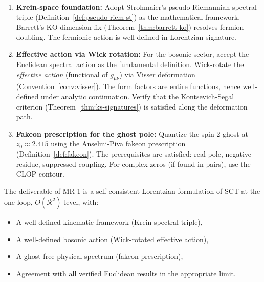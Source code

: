 \documentclass[12pt,a4paper]{article}
\theoremstyle{definition}
\theoremstyle{remark}
\begin{document}
\begin{enumerate}[label=\textbf{(\Alph*)}]

\item \textbf{Krein-space foundation:}
  Adopt Strohmaier's pseudo-Riemannian spectral triple
  (Definition~\ref{def:pseudo-riem-st}) as the mathematical framework.
  Barrett's KO-dimension fix (Theorem~\ref{thm:barrett-ko}) resolves
  fermion doubling.  The fermionic action is well-defined in Lorentzian
  signature.

\item \textbf{Effective action via Wick rotation:}
  For the bosonic sector, accept the Euclidean spectral action as the
  fundamental definition.  Wick-rotate the \emph{effective action}
  (functional of $g_{\mu\nu}$) via Visser deformation
  (Convention~\ref{conv:visser}).  The form factors are entire functions,
  hence well-defined under analytic continuation.  Verify that the
  Kontsevich-Segal criterion (Theorem~\ref{thm:ks-signatures}) is
  satisfied along the deformation path.

\item \textbf{Fakeon prescription for the ghost pole:}
  Quantize the spin-2 ghost at $z_0 \approx 2.415$ using the
  Anselmi-Piva fakeon prescription
  (Definition~\ref{def:fakeon}).  The prerequisites are satisfied:
  real pole, negative residue, suppressed coupling.  For complex zeros
  (if found in pairs), use the CLOP contour.
\end{enumerate}

The deliverable of MR-1 is a self-consistent Lorentzian formulation of
SCT at the one-loop, $O(\mathcal{R}^2)$ level, with:
\begin{itemize}[nosep]
  \item A well-defined kinematic framework (Krein spectral triple),
  \item A well-defined bosonic action (Wick-rotated effective action),
  \item A ghost-free physical spectrum (fakeon prescription),
  \item Agreement with all verified Euclidean results in the
    appropriate limit.
\end{itemize}
\end{document}
